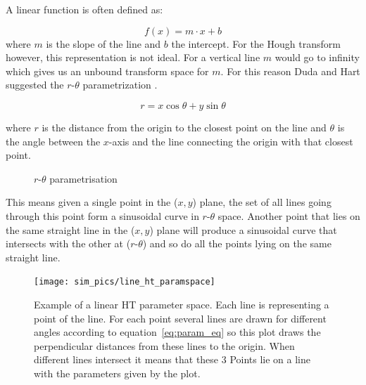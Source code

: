 \documentclass[11pt,twoside]{scrreprt}
\begin{document}
A linear function is often defined as:

\[
  f(x) = m\cdot x + b
\]
where $m$ is the slope of the line and $b$ the intercept. For the Hough transform however, this representation is not ideal. For a 
vertical line $m$ would go to infinity which gives us an unbound transform space for $m$. For this reason Duda and Hart suggested the 
$r\text{-}\theta$ parametrization \parencite{Duda:1972}.

\begin{equation}
  r = x\cos\theta + y\sin\theta\label{eq:param_eq}
\end{equation}

where $r$ is the distance from the origin to the closest point on the line and $\theta$ is the angle between the $x$-axis and the line 
connecting the origin with that closest point.

\begin{figure}[ht]
  \centering
  \caption{$r\text{-}\theta$ parametrisation}
  \label{fig:rhotheta}
\end{figure}

This means given a single point in the ($x,y$) plane, the set of all lines going through this point form a sinusoidal curve in 
$r\text{-}\theta$ space. Another point that lies on the same straight line in the ($x,y$) plane will produce a sinusoidal curve that 
intersects with the other at ($r\text{-}\theta$) and so do all the points lying on the same straight line. 


\begin{figure}[tb]
  \centering
  \texttt{[image: sim\_pics/line\_ht\_paramspace]}
  \caption[Example of a linear HT space]{Example of a linear HT parameter space. Each line is representing a point of the line. For each 
  point several lines are drawn for different angles according to equation~\ref{eq:param_eq} so this plot draws the perpendicular 
  distances from these lines to the origin. When different lines intersect it means that these 3 Points lie on a line with the parameters 
  given by the plot.}
  \label{fig:line_ht}
\end{figure}
\end{document}

